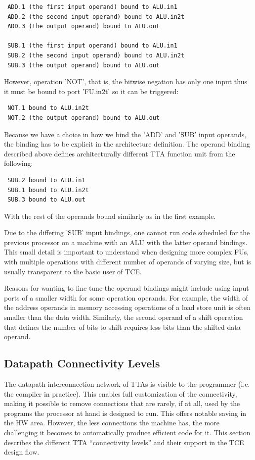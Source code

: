 \documentclass[a4paper,twoside]{tceusermanual}
\begin{document}
\begin{verbatim}
 ADD.1 (the first input operand) bound to ALU.in1
 ADD.2 (the second input operand) bound to ALU.in2t
 ADD.3 (the output operand) bound to ALU.out

 SUB.1 (the first input operand) bound to ALU.in1
 SUB.2 (the second input operand) bound to ALU.in2t
 SUB.3 (the output operand) bound to ALU.out
\end{verbatim}

However, operation 'NOT', that is, the bitwise negation has only one input
thus it must be bound to port 'FU.in2t' so it can be triggered:

\begin{verbatim}
 NOT.1 bound to ALU.in2t
 NOT.2 (the output operand) bound to ALU.out
\end{verbatim}

Because we have a choice in how we bind the 'ADD' and 'SUB' input operands,
the binding has to be explicit in the architecture definition. The operand
binding described above defines architecturally different TTA function unit
from the following:

\begin{verbatim}
 SUB.2 bound to ALU.in1
 SUB.1 bound to ALU.in2t
 SUB.3 bound to ALU.out
\end{verbatim}

With the rest of the operands bound similarly as in the first example.

Due to the differing 'SUB' input bindings, one cannot run code scheduled
for the previous processor on a machine with an ALU with the latter 
operand bindings. This small detail is important to understand when 
designing more complex FUs, with multiple operations with different number of 
operands of varying size, but is usually transparent to the basic user of 
TCE.

Reasons for wanting to fine tune the operand bindings might include using
input ports of a smaller width for some operation operands. For example, the 
width of the address operands in memory accessing operations of a load store 
unit is often smaller than the data width. Similarly, the second operand of
a shift operation that defines the number of bits to shift requires less
bits than the shifted data operand.


\subsection{Datapath Connectivity Levels}
\label{ConnectivityLevels}
The datapath interconnection network of TTAs is visible to the
programmer (i.e. the compiler in practice).  This enables full
customization of the connectivity, making it possible to remove
connections that are rarely, if at all, used by the programs the
processor at hand is designed to run. This offers notable saving in
the HW area. However, the less connections the machine has, the more
challenging it becomes to automatically produce efficient code for
it. This section describes the different TTA ``connectivity levels''
and their support in the TCE design flow.
\end{document}
